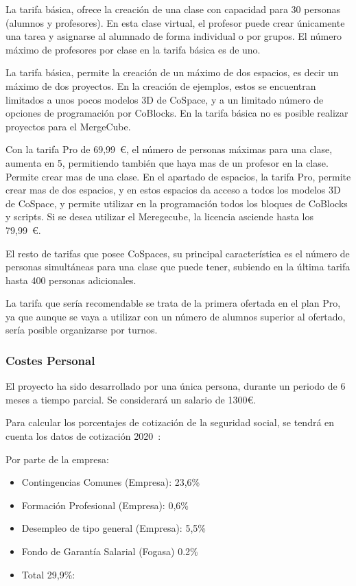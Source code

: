 La tarifa básica, ofrece la creación de una clase con capacidad para 30 personas (alumnos y profesores). En esta clase virtual, el profesor puede crear únicamente una tarea y asignarse al alumnado de forma individual o por grupos. El número máximo de profesores por clase en la tarifa básica es de uno.

La tarifa básica, permite la creación de un máximo de dos espacios, es decir un máximo de dos proyectos. En la creación de ejemplos, estos se encuentran limitados a unos pocos modelos 3D de CoSpace, y a un limitado número de opciones de programación por CoBlocks. En la tarifa básica no es posible realizar proyectos para el MergeCube.

Con la tarifa Pro de 69,99~\euro{}, el número de personas máximas para una clase, aumenta en 5, permitiendo también que haya mas de un profesor en la clase. Permite crear mas de una clase. En el apartado de espacios, la tarifa Pro, permite crear mas de dos espacios, y en estos espacios da acceso a todos los modelos 3D de CoSpace, y permite utilizar en la programación todos los bloques de CoBlocks y scripts.
Si se desea utilizar el Meregecube, la licencia asciende hasta los 79,99~\euro{}. 

El resto de tarifas que posee CoSpaces, su principal característica es el número de personas simultáneas para una clase que puede tener, subiendo en la última tarifa hasta 400 personas adicionales.

La tarifa que sería recomendable se trata de la primera ofertada en el plan Pro, ya que aunque se vaya a utilizar con un número de alumnos superior al ofertado, sería posible organizarse por turnos.

\subsubsection{Costes Personal}
El proyecto ha sido desarrollado por una única persona, durante un periodo de 6 meses a tiempo parcial. Se considerará un salario de 1300\euro.

Para calcular los porcentajes de cotización de la seguridad social, se tendrá en cuenta los datos de cotización 2020~\cite{contingencias2020}:

Por parte de la empresa:
\begin{itemize}
	\item Contingencias Comunes (Empresa): 23,6\%
	\item Formación Profesional (Empresa): 0,6\%
	\item Desempleo de tipo general (Empresa): 5,5\%
	\item Fondo de Garantía Salarial (Fogasa) 0.2\%
	\item Total 29,9\%:
\end{itemize}

